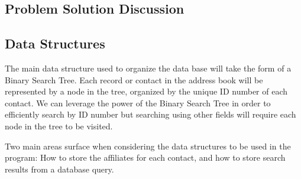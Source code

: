 \documentclass[11pt]{article}
\begin{document}
\subsection*{Problem Solution Discussion}


\subsection*{Data Structures}

	The main data structure used to organize the data base will take the form of a Binary Search Tree. Each record or contact
in the address book will be represented by a node in the tree, organized by the unique ID number of each contact. We can
leverage the power of the Binary Search Tree in order to efficiently search by ID number but searching using other fields
will require each node in the tree to be visited.
	
	Two main areas surface when considering the data structures to be used in the program: How to store the affiliates for each contact, and how to store search results from a database query.
	
\end{document}

